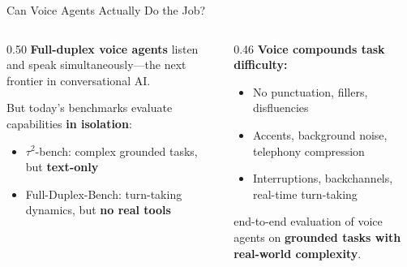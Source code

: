 \documentclass[aspectratio=169]{beamer}
\newcommand{\tautwobench}{$\tau^2$-bench}
\begin{document}
\begin{frame}{Can Voice Agents Actually Do the Job?}

  \begin{columns}[T]
    \begin{column}{0.50\textwidth}
      \textbf{Full-duplex voice agents} listen and speak simultaneously---the next frontier in conversational AI.

      \vspace{0.8em}
      But today's benchmarks evaluate capabilities \textbf{in isolation}:
      \begin{itemize}
        \item \tautwobench{}: complex grounded tasks, but \textbf{text-only}
        \item Full-Duplex-Bench: turn-taking dynamics, but \textbf{no real tools}
      \end{itemize}
    \end{column}
    \begin{column}{0.46\textwidth}
      \textbf{Voice compounds task difficulty:}
      \begin{itemize}
        \item No punctuation, fillers, disfluencies
        \item Accents, background noise, telephony compression
        \item Interruptions, backchannels, real-time turn-taking
      \end{itemize}

      \vspace{0.8em}
      \textcolor{SierraOrange}{} end-to-end evaluation of voice agents on \textbf{grounded tasks with real-world complexity}.
    \end{column}
  \end{columns}

\end{frame}

\end{document}
